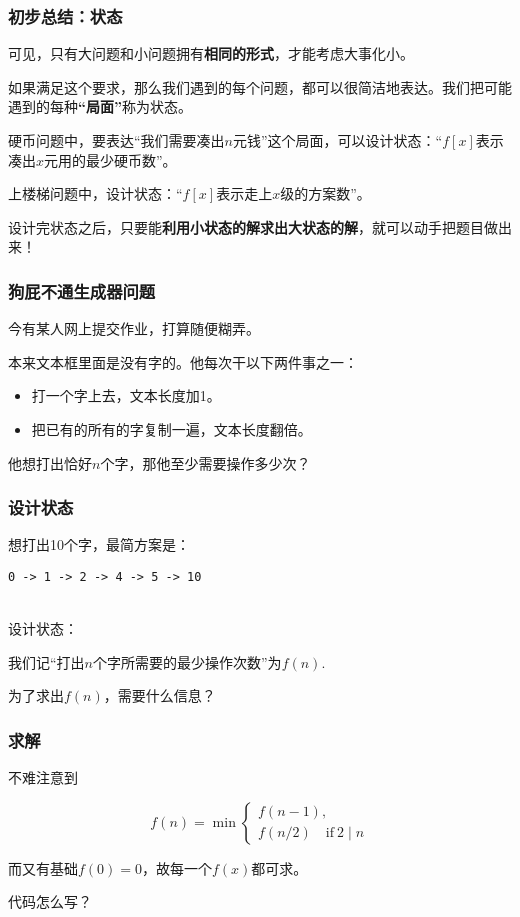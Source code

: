 \documentclass{beamer}
\begin{document}
\begin{frame}
    \frametitle{初步总结：状态}

    可见，只有大问题和小问题拥有\textbf{相同的形式}，才能考虑大事化小。

    如果满足这个要求，那么我们遇到的每个问题，都可以很简洁地表达。我们把可能遇到的每种\textbf{“局面”}称为状态。

    \begin{example}
        硬币问题中，要表达“我们需要凑出$n$元钱”这个局面，可以设计状态：“$f[x]$表示凑出$x$元用的最少硬币数”。

        上楼梯问题中，设计状态：“$f[x]$表示走上$x$级的方案数”。
    \end{example}

    设计完状态之后，只要能\textbf{利用小状态的解求出大状态的解}，就可以动手把题目做出来！

\end{frame}

\begin{frame}
    \frametitle{狗屁不通生成器问题}

    今有某人网上提交作业，打算随便糊弄。

    本来文本框里面是没有字的。他每次干以下两件事之一：

    \begin{itemize}
        \item 打一个字上去，文本长度加1。
        \item 把已有的所有的字复制一遍，文本长度翻倍。
    \end{itemize}

    他想打出恰好$n$个字，那他至少需要操作多少次？

\end{frame}

\begin{frame}
    \frametitle{设计状态}

    想打出10个字，最简方案是：

    \texttt{0 -> 1 -> 2 -> 4 -> 5 -> 10}

    ~\\

    设计状态：

    我们记``打出$n$个字所需要的最少操作次数''为$f(n)$.

    为了求出$f(n)$，需要什么信息？

\end{frame}

\begin{frame}
    \frametitle{求解}

    不难注意到

    $$f(n) = \min \begin{cases}
        f(n - 1), \\
        f(n/2)\quad \text{if} ~ 2\mid n
    \end{cases}$$

    而又有基础$f(0)=0$，故每一个$f(x)$都可求。

    代码怎么写？

\end{frame}
\end{document}
